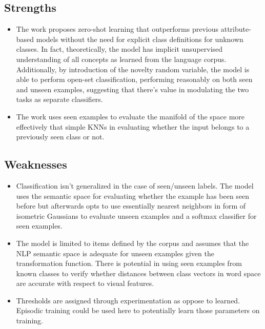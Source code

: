 \documentclass{article}
\begin{document}
\subsection{Strengths}
\begin{itemize}
    \item The work proposes zero-shot learning that outperforms previous attribute-based models without the need for explicit class definitions for unknown classes. In fact, theoretically, the model has implicit unsupervised understanding of all concepts as learned from the language corpus. Additionally, by introduction of the novelty random variable, the model is able to perform open-set classification, performing reasonably on both seen and unseen examples, suggesting that there's value in modulating the two tasks as separate classifiers.
    \item The work uses seen examples to evaluate the manifold of the space more effectively that simple KNNs in evaluating whether the input belongs to a previously seen class or not.
\end{itemize}

\subsection{Weaknesses}
\begin{itemize}
    \item Classification isn't generalized in the case of seen/unseen labels. The model uses the semantic space for evaluating whether the example has been seen before but afterwards opts to use essentially nearest neighbors in form of isometric Gaussians to evaluate unseen examples and a softmax classifier for seen examples.
    \item The model is limited to items defined by the corpus and assumes that the NLP semantic space is adequate for unseen examples given the transformation function. There is potential in using seen examples from known classes to verify whether distances between class vectors in word space are accurate with respect to visual features.
    \item Thresholds are assigned through experimentation as oppose to learned. Episodic training could be used here to potentially learn those parameters on training.
\end{itemize}
\end{document}
